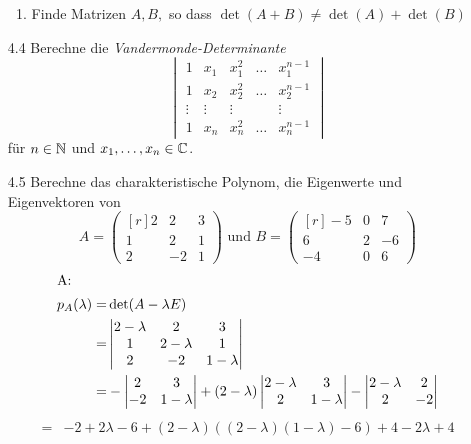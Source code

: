 \documentclass{HM}
\begin{document}
\begin{enumerate}
\begin{enumerate}
			\item Finde Matrizen $A,B,$ so dass $\det(A+B)\not=\det(A)+\det(B)$
		\end{enumerate}
		
	\item[4.4] Berechne die \textit{Vandermonde-Determinante}\\
		$$\begin{vmatrix}
			1&x_1&x_1^2&\hdots&x_1^{n-1}\\
			1&x_2&x_2^2&\hdots&x_2^{n-1}\\
			\vdots&\vdots&\vdots&&\vdots\\
			1&x_n&x_n^2&\hdots&x_n^{n-1}
		\end{vmatrix}$$
		für $n\in\mathbb{N}$ und $x_1,\hdots,x_n\in\mathbb{C}$.
		
	\item[4.5] Berechne das charakteristische Polynom, die Eigenwerte und Eigenvektoren von
	$$A=\begin{pmatrix*}[r]
		2&2&3\\
		1&2&1\\
		2&-2&1
	\end{pmatrix*} \text{ und } B=\begin{pmatrix*}[r]
		-5&0&7\\
		6&2&-6\\
		-4&0&6
	\end{pmatrix*}$$
	\begin{align*}
		\intertext{A:}
		p_A(\lambda)=&\det(A -\lambda E)\\
		=&\begin{vmatrix}
			2-\lambda&2&3\\
			1&2-\lambda&1\\
			2&-2&1-\lambda
		\end{vmatrix}\\
		=&-\begin{vmatrix}
			2&3\\
			-2&1-\lambda
		\end{vmatrix}+(2-\lambda)\begin{vmatrix}
			2-\lambda&3\\
			2&1-\lambda
		\end{vmatrix}-\begin{vmatrix}
			2-\lambda&2\\
			2&-2
		\end{vmatrix}\\
	\end{align*}
	\begin{align*}
		=&-2+2\lambda-6+(2-\lambda)((2-\lambda)(1-\lambda)-6)+4-2\lambda+4\\

\end{align*}
\end{enumerate}
\end{document}
